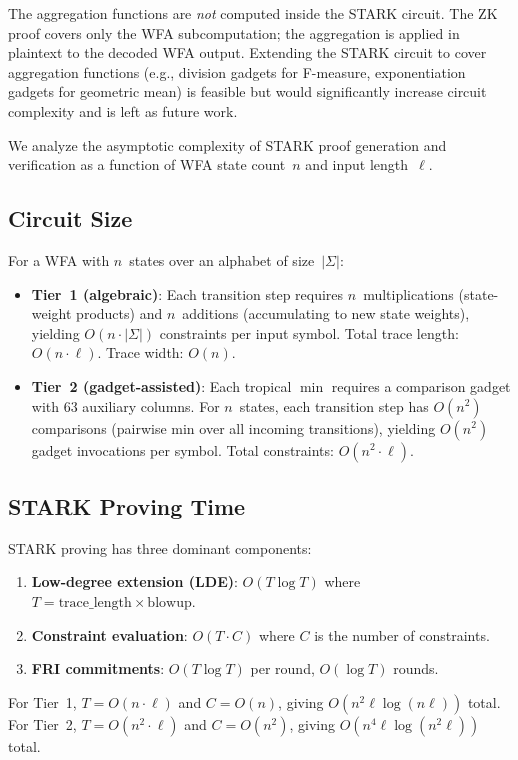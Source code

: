 \documentclass[11pt]{article}
\begin{document}
\noindent
The aggregation functions are \emph{not} computed inside the STARK
circuit.  The ZK proof covers only the WFA subcomputation; the
aggregation is applied in plaintext to the decoded WFA output.
Extending the STARK circuit to cover aggregation functions (e.g.,
division gadgets for F-measure, exponentiation gadgets for geometric
mean) is feasible but would significantly increase circuit complexity
and is left as future work.

We analyze the asymptotic complexity of STARK proof generation and
verification as a function of WFA state count~$n$ and input length~$\ell$.

\subsection{Circuit Size}

For a WFA with $n$~states over an alphabet of size~$|\Sigma|$:
\begin{itemize}[nosep]
\item \textbf{Tier~1 (algebraic)}: Each transition step requires
  $n$~multiplications (state-weight products) and $n$~additions
  (accumulating to new state weights), yielding $O(n \cdot |\Sigma|)$
  constraints per input symbol.  Total trace length: $O(n \cdot \ell)$.
  Trace width: $O(n)$.
\item \textbf{Tier~2 (gadget-assisted)}: Each tropical $\min$ requires
  a comparison gadget with 63 auxiliary columns.  For $n$~states,
  each transition step has $O(n^2)$ comparisons (pairwise min over
  all incoming transitions), yielding $O(n^2)$ gadget invocations per
  symbol.  Total constraints: $O(n^2 \cdot \ell)$.
\end{itemize}

\subsection{STARK Proving Time}

STARK proving has three dominant components:
\begin{enumerate}[nosep]
\item \textbf{Low-degree extension (LDE)}: $O(T \log T)$ where
  $T = \text{trace\_length} \times \text{blowup}$.
\item \textbf{Constraint evaluation}: $O(T \cdot C)$ where $C$ is
  the number of constraints.
\item \textbf{FRI commitments}: $O(T \log T)$ per round,
  $O(\log T)$ rounds.
\end{enumerate}
For Tier~1, $T = O(n \cdot \ell)$ and $C = O(n)$, giving
$O(n^2 \ell \log(n\ell))$ total.
For Tier~2, $T = O(n^2 \cdot \ell)$ and $C = O(n^2)$, giving
$O(n^4 \ell \log(n^2\ell))$ total.
\end{document}

